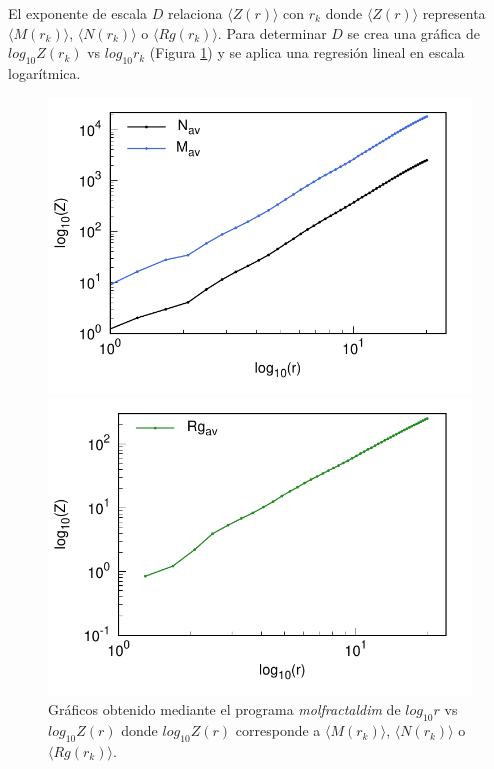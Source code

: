  	El exponente de escala $D$ relaciona $\langle Z(r) \rangle$ 
 	con $r_{k}$ donde $\langle Z(r) \rangle$ representa $\langle M(r_k) \rangle$, $\langle N(r_k) \rangle$ o $\langle Rg(r_k) \rangle$. 
 	Para determinar $D$ se crea una gráfica de $log_{10}Z(r_k)$ 
 	vs $log_{10}r_{k}$ (Figura \ref{fig:GrafD}) y se aplica una 
 	regresión lineal en escala logarítmica.
 	
	\begin{figure}[H]
		\hspace{-0.3cm} 
		\begin{minipage}{0.49\textwidth}
			\centering
			\includegraphics[width=\linewidth]{graphs/molmass/Zvsr.pdf}
		\end{minipage}
		\hspace{0.2cm}
		\begin{minipage}{0.49\textwidth}
			\centering
			\includegraphics[width=\linewidth]{graphs/molmass/Zvsr-Rg.pdf}
		\end{minipage}
		
		\caption{
			Gr\'{a}ficos obtenido mediante el programa \textit{molfractaldim} de $log_{10}r$ vs $log_{10}Z(r)$ donde $log_{10}Z(r)$ 
			corresponde a $\langle M(r_k) \rangle$, $\langle N(r_k) \rangle$ 
			o $\langle Rg(r_k) \rangle$. }
		\label{fig:GrafD}
	\end{figure}

